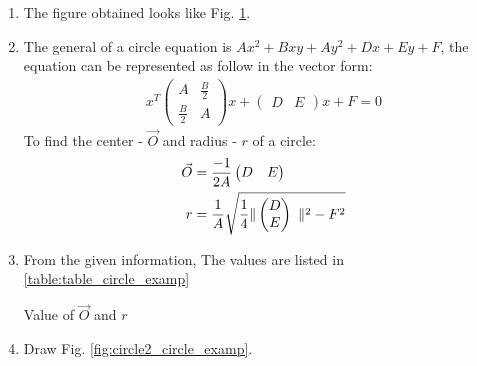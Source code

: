\renewcommand{\theequation}{\theenumi}
\begin{enumerate}[label=\thesubsection.\arabic*.,ref=\thesubsection.\theenumi]

\begin{figure}[!ht]
\centering
\resizebox{\columnwidth}{!}{}
\caption{Circle by Latex-Tikz}
\label{fig:circle_circle_examp}	
\end{figure}

\item The figure obtained looks like Fig. \ref{fig:circle_circle_examp}.\\ 

\item The general of a circle equation is $Ax^2 + Bxy + Ay^2 + Dx + Ey + F$, the equation can be represented as follow in the vector form:
\begin{align}
x^T 
\begin{pmatrix}
A & \frac{B}{2} \\
\frac{B}{2} & A
\end{pmatrix}
x + 
\begin{pmatrix}
D & E 
\end{pmatrix}
x + F = 0
\end{align}
To find the center - $\vec{O}$ and radius - $r$ of a circle:
\begin{align}
\vec{O} &= \frac{-1}{2A}\begin{pmatrix}
D & E 
\end{pmatrix}\label{eq:circle_example}\\
r &= \frac{1}{A}\sqrt{ \frac{1}{4} \| \begin{pmatrix}D\\ E\end{pmatrix}\ \|^2 - F^2}\label{eq:circle_example2}
\end{align}

\item
From the given information, 
The values are listed in \ref{table:table_circle_examp}\\
\begin{table}[ht!]
\centering

\caption{Value of $\vec{O}$ and $r$}
\label{table:table_circle_examp}	
\end{table} 

\item Draw Fig. \ref{fig:circle2_circle_examp}.


\end{enumerate}
